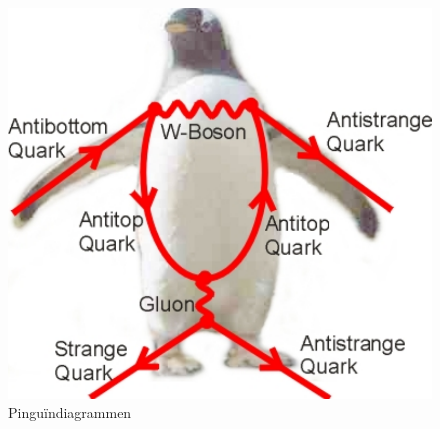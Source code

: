 \documentclass[../main.tex]{subfiles}
\begin{document}
\begin{figure}[h]
    \centering
    \includegraphics[width=0.8\linewidth]{physics_beyond_the_standard_model/pinguin_diagrammen.png}
    \caption{Pinguïndiagrammen}%
    \label{fig:physics_beyond_the_standard_model/pinguin_diagrammen}
\end{figure}
\end{document}
